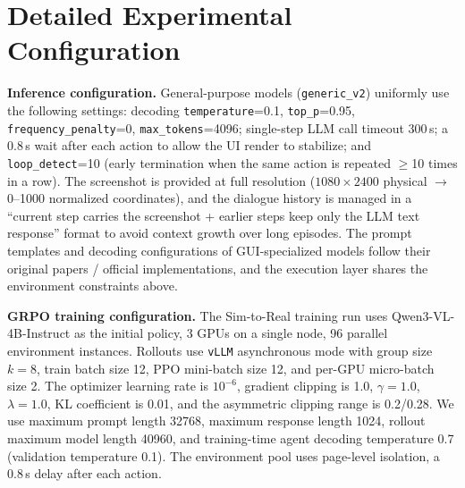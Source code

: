 \section{Detailed Experimental Configuration}\label{app:exp-config}

\textbf{Inference configuration.} General-purpose models (\texttt{generic\_v2}) uniformly use the following settings: decoding \texttt{temperature}=0.1, \texttt{top\_p}=0.95, \texttt{frequency\_penalty}=0, \texttt{max\_tokens}=4096; single-step LLM call timeout 300\,s; a 0.8\,s wait after each action to allow the UI render to stabilize; and \texttt{loop\_detect}=10 (early termination when the same action is repeated $\geq$10 times in a row). The screenshot is provided at full resolution ($1080 \times 2400$ physical $\to$ 0--1000 normalized coordinates), and the dialogue history is managed in a ``current step carries the screenshot + earlier steps keep only the LLM text response'' format to avoid context growth over long episodes. The prompt templates and decoding configurations of GUI-specialized models follow their original papers / official implementations, and the execution layer shares the environment constraints above.

\textbf{GRPO training configuration.} The Sim-to-Real training run uses Qwen3-VL-4B-Instruct as the initial policy, 3 GPUs on a single node, 96 parallel environment instances. Rollouts use \texttt{vLLM} asynchronous mode with group size $k=8$, train batch size 12, PPO mini-batch size 12, and per-GPU micro-batch size 2. The optimizer learning rate is $10^{-6}$, gradient clipping is 1.0, $\gamma=1.0$, $\lambda=1.0$, KL coefficient is 0.01, and the asymmetric clipping range is 0.2/0.28. We use maximum prompt length 32768, maximum response length 1024, rollout maximum model length 40960, and training-time agent decoding temperature 0.7 (validation temperature 0.1). The environment pool uses page-level isolation, a 0.8\,s delay after each action.

